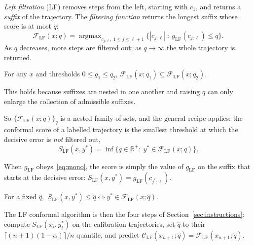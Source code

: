 \documentclass[11pt]{article}
\theoremstyle{definition}
\newcommand{\C}{\mathcal{C}}
\newcommand{\F}{\mathcal{F}}
\newcommand{\qhat}{\hat{q}}
\newcommand{\R}{\mathbb{R}}
\newcommand{\LF}{\mathrm{LF}}
\newcommand{\ystar}{y^*}
\newcommand{\jstar}{j^*}
\begin{document}
\emph{Left filtration} (LF) removes steps from the left, starting with $c_1$, and returns a \emph{suffix} of the trajectory. The \emph{filtering function} returns the longest suffix whose score is at most $q$:
\begin{equation}\label{eq:FLF}
\F_\LF(x;q)=\mathop{\arg\max}_{c_{j:\ell},\ 1\le j\le\ell+1}\big\{|c_{j:\ell}|\ :\ g_\LF(c_{j:\ell})\le q\big\}.
\end{equation}
As $q$ decreases, more steps are filtered out; as $q\to\infty$ the whole trajectory is returned.

\begin{lemma}\label{lem:nest}
For any $x$ and thresholds $0\le q_1\le q_2$, $\F_\LF(x;q_1)\subseteq\F_\LF(x;q_2)$.
\end{lemma}
\noindent This holds because suffixes are nested in one another and raising $q$ can only enlarge the collection of admissible suffixes.

So $\{\F_\LF(x;q)\}_q$ is a nested family of sets, and the general recipe applies: the conformal score of a labelled trajectory is the smallest threshold at which the decisive error is \emph{not} filtered out,
\begin{equation}\label{eq:SLF}
S_\LF(x,\ystar)=\inf\big\{q\in\R^+:\ \ystar\in\F_\LF(x;q)\big\}.
\end{equation}

\begin{proposition}\label{prop:closed}
When $g_\LF$ obeys~\eqref{eq:mono}, the score is simply the value of $g_\LF$ on the suffix that starts at the decisive error: $S_\LF(x,\ystar)=g_\LF(c_{\jstar:\ell})$.
\end{proposition}

\begin{lemma}\label{lem:equiv}
For a fixed $\qhat$, $\ S_\LF(x,\ystar)\le\qhat\iff\ystar\in\F_\LF(x;\qhat)$.
\end{lemma}

The LF conformal algorithm is then the four steps of Section~\ref{sec:instructions}: compute $S_\LF(x_i,\ystar_i)$ on the calibration trajectories, set $\qhat$ to their $\lceil(n+1)(1-\alpha)\rceil/n$ quantile, and predict $\C_\LF(x_{n+1};\qhat)=\F_\LF(x_{n+1};\qhat)$.
\end{document}
